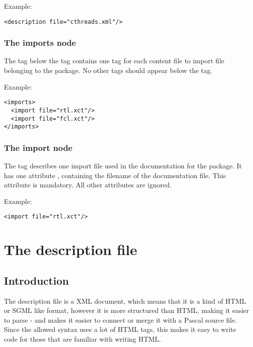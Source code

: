 Example:
\begin{verbatim}
<description file="cthreads.xml"/>
\end{verbatim}

\subsection{The imports node}
\label{project:imports}
The  tag below the  tag contains one
 tag for each content file to import file belonging to the package.
No other tags should appear below the  tag.

Example:
\begin{verbatim}
<imports>
  <import file="rtl.xct"/>
  <import file="fcl.xct"/>
</imports>
\end{verbatim}


\subsection{The import node}
\label{project:import}
The  tag describes one import file used in the
documentation for the package. It has one attribute , containing
the filename of the documentation file. This attribute is mandatory. All
other attributes are ignored.

Example:
\begin{verbatim}
<import file="rtl.xct"/>
\end{verbatim}

\chapter{The description file}
\label{ch:descriptionfile}

\section{Introduction}
The description file is a XML document, which means that it is a kind of
HTML or SGML like format, however it is more structured than HTML, making it
easier to parse - and makes it easier to connect or merge it with a Pascal
source file. Since the allowed syntax uses a lot of HTML tags, this makes 
it easy to write code for those that are familiar with writing HTML.

